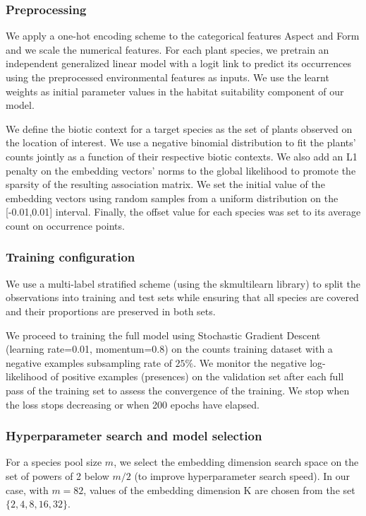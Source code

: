 \documentclass[]{article}
\begin{document}
\subsubsection{Preprocessing}
We apply a one-hot encoding scheme to the categorical features Aspect and Form and we scale the numerical features. For each plant species, we pretrain an independent generalized linear model with a logit link to predict its occurrences using the preprocessed environmental features as inputs. We use the learnt weights as initial parameter values in the habitat suitability component of our model. 

We define the biotic context for a target species as the set of plants observed on the location of interest. We use a negative binomial distribution to fit the plants' counts jointly as a function of their respective biotic contexts.  We also add an L1 penalty on the embedding vectors' norms to the global likelihood to promote the sparsity of the resulting association matrix. We set the initial value of the embedding vectors using random samples from a uniform distribution on the [-0.01,0.01] interval. Finally, the offset value for each species was set to its average count on occurrence points.

\subsubsection{Training configuration}
We use a multi-label stratified scheme (using the skmultilearn library) to split the observations into training and test sets while ensuring that all species are covered and their proportions are preserved in both sets. 

We proceed to training the full model using Stochastic Gradient Descent (learning rate=0.01, momentum=0.8) on the counts training dataset with a negative examples subsampling rate of $25\%$. We monitor the negative log-likelihood of positive examples (presences) on the validation set after each full pass of the training set to assess the convergence of the training. We stop when the loss stops decreasing or when 200 epochs have elapsed.

\subsubsection{Hyperparameter search and model selection}
For a species pool size $m$, we select the embedding dimension search space on the set of powers of 2 below $m/2$ (to improve hyperparameter search speed). In our case, with $m=82$, values of the embedding dimension K are chosen from the set $\{2,4,8,16,32\}$. 
\end{document}
